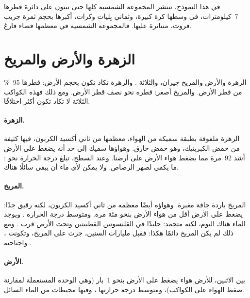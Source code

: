 في هذا النموذج، تنتشر المجموعة الشمسية كلها حتى نبتون على
دائرة قطرها 7~كيلومترات، في وسطها كرة كبيرة، وثماني بِليات
وكرات، أكبرها بحجم ثمرة جريب فروت، متناثرة عليها.
فالمجموعة الشمسية في معظمها فضاء فارغ.

\section{الزهرة والأرض والمريخ}

الزهرة والأرض والمريخ جيران، والثلاثة . والزهرة
تكاد تكون بحجم الأرض: قطرها 95~\% من قطر الأرض.
والمريخ أصغر: قطره نحو نصف قطر الأرض. ومع ذلك فهذه الكواكب
الثلاثة لا تكاد تكون أكثر اختلافًا.

\paragraph{الزهرة.} الزهرة ملفوفة بطبقة سميكة من الهواء، معظمها من
ثاني أكسيد الكربون، فيها  كثيفة من حمض الكبريتيك، وهو حمض حارق.
وهواؤها سميك إلى حد أنه يضغط على الأرض أشد 92~مرة مما يضغط هواء
الأرض على أرضنا. وعند السطح، تبلغ درجة الحرارة نحو
: ما يكفي لصهر الرصاص. ولا يمكن لأي ماء أن يبقى
سائلًا هناك.

\paragraph{المريخ.} المريخ  باردة جافة مغبرة. وهواؤه أيضًا معظمه
من ثاني أكسيد الكربون، لكنه رقيق جدًا: يضغط على الأرض
أقل من هواء الأرض بنحو مئة مرة. ومتوسط درجة الحرارة
. ويوجد الماء هناك اليوم، لكنه متجمد: جليدًا في
القلنسوتين القطبيتين وتحت الأرض قرب . ومع ذلك لم يكن المريخ دائمًا
هكذا: فقبل مليارات السنين، جرت  على المريخ، وتكونت ،
واجتاحته .

\paragraph{الأرض.} بين الاثنين، للأرض هواء يضغط على
الأرض بنحو 1~بار (وهي الوحدة المستعملة لمقارنة ضغط
الهواء على الكواكب)، ومتوسط درجة حرارتها ، وفيها محيطات من
الماء السائل.

